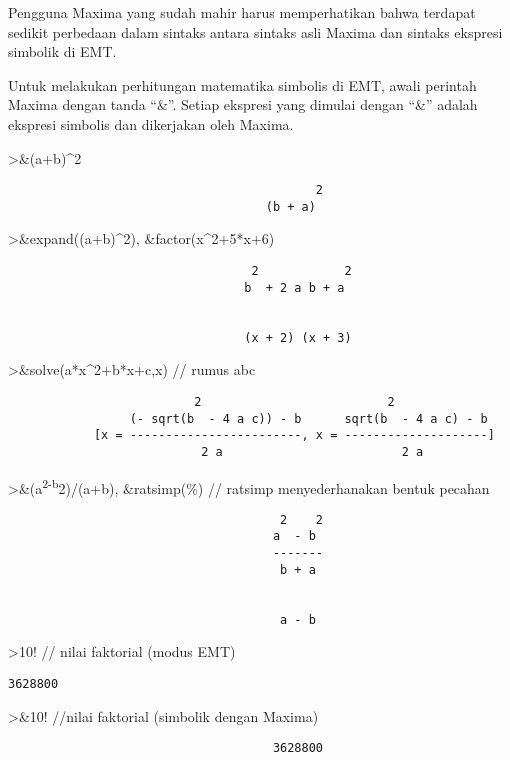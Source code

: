 \documentclass[
]{book}
\begin{document}
Pengguna Maxima yang sudah mahir harus memperhatikan bahwa terdapat sedikit perbedaan dalam sintaks antara sintaks asli Maxima dan sintaks ekspresi simbolik di EMT.

Untuk melakukan perhitungan matematika simbolis di EMT, awali perintah Maxima dengan tanda ``\&''. Setiap ekspresi yang dimulai dengan ``\&'' adalah ekspresi simbolis dan dikerjakan oleh Maxima.

\textgreater\&(a+b)\^{}2

\begin{verbatim}
                                           2
                                    (b + a)
\end{verbatim}

\textgreater\&expand((a+b)\^{}2), \&factor(x\^{}2+5*x+6)

\begin{verbatim}
                                  2            2
                                 b  + 2 a b + a


                                 (x + 2) (x + 3)
\end{verbatim}

\textgreater\&solve(a*x\^{}2+b*x+c,x) // rumus abc

\begin{verbatim}
                          2                          2
                 (- sqrt(b  - 4 a c)) - b      sqrt(b  - 4 a c) - b
            [x = ------------------------, x = --------------------]
                           2 a                         2 a
\end{verbatim}

\textgreater\&(a\textsuperscript{2-b}2)/(a+b), \&ratsimp(\%) // ratsimp menyederhanakan bentuk pecahan

\begin{verbatim}
                                      2    2
                                     a  - b
                                     -------
                                      b + a


                                      a - b
\end{verbatim}

\textgreater10! // nilai faktorial (modus EMT)

\begin{verbatim}
3628800
\end{verbatim}

\textgreater\&10! //nilai faktorial (simbolik dengan Maxima)

\begin{verbatim}
                                     3628800
\end{verbatim}
\end{document}
